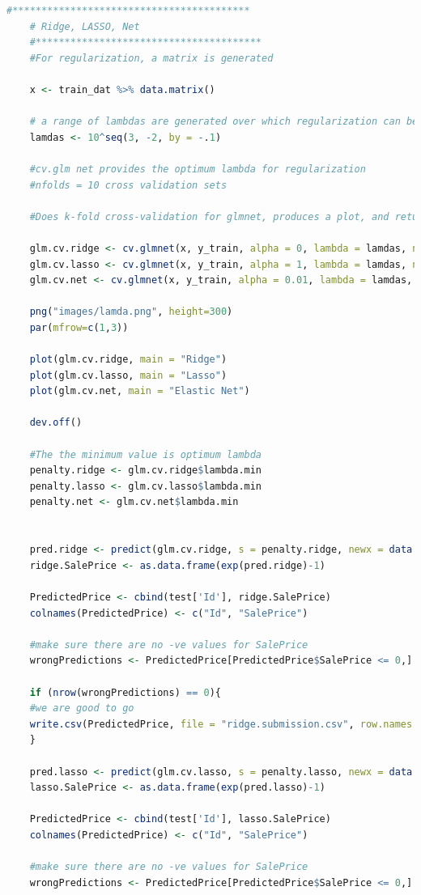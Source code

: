 \documentclass[sigconf]{acmart}
\begin{document}
	\begin{lstlisting}[language=R]
	#*****************************************
	# Ridge, LASSO, Net
	#***************************************
	#For regularization, a matrix is generated
	
	x <- train_dat %>% data.matrix()
	
	# a range of lambdas are generated over which regularization can be tested
	lamdas <- 10^seq(3, -2, by = -.1)
	
	#cv.glm net provides the optimum lambda for regularization
	#nfolds = 10 cross validation sets
	
	#Does k-fold cross-validation for glmnet, produces a plot, and returns a value for lambda
	
	glm.cv.ridge <- cv.glmnet(x, y_train, alpha = 0, lambda = lamdas, nfolds = 10)
	glm.cv.lasso <- cv.glmnet(x, y_train, alpha = 1, lambda = lamdas, nfolds = 10)
	glm.cv.net <- cv.glmnet(x, y_train, alpha = 0.01, lambda = lamdas, nfolds = 10)
	
	png("images/lamda.png", height=300)
	par(mfrow=c(1,3))
	
	plot(glm.cv.ridge, main = "Ridge")
	plot(glm.cv.lasso, main = "Lasso")
	plot(glm.cv.net, main = "Elastic Net")
	
	dev.off()
	
	#The the minimum value is optimum lambda 
	penalty.ridge <- glm.cv.ridge$lambda.min
	penalty.lasso <- glm.cv.lasso$lambda.min
	penalty.net <- glm.cv.net$lambda.min
	
	
	pred.ridge <- predict(glm.cv.ridge, s = penalty.ridge, newx = data.matrix(test_dat))
	ridge.SalePrice <- as.data.frame(exp(pred.ridge)-1)
	
	PredictedPrice <- cbind(test['Id'], ridge.SalePrice)
	colnames(PredictedPrice) <- c("Id", "SalePrice")
	
	#make sure there are no -ve values for SalePrice
	wrongPredictions <- PredictedPrice[PredictedPrice$SalePrice <= 0,]
	
	if (nrow(wrongPredictions) == 0){
	#we are good to go
	write.csv(PredictedPrice, file = "ridge.submission.csv", row.names = F)
	}
	
	pred.lasso <- predict(glm.cv.lasso, s = penalty.lasso, newx = data.matrix(test_dat))
	lasso.SalePrice <- as.data.frame(exp(pred.lasso)-1)
	
	PredictedPrice <- cbind(test['Id'], lasso.SalePrice)
	colnames(PredictedPrice) <- c("Id", "SalePrice")
	
	#make sure there are no -ve values for SalePrice
	wrongPredictions <- PredictedPrice[PredictedPrice$SalePrice <= 0,]
	

\end{lstlisting}
\end{document}
